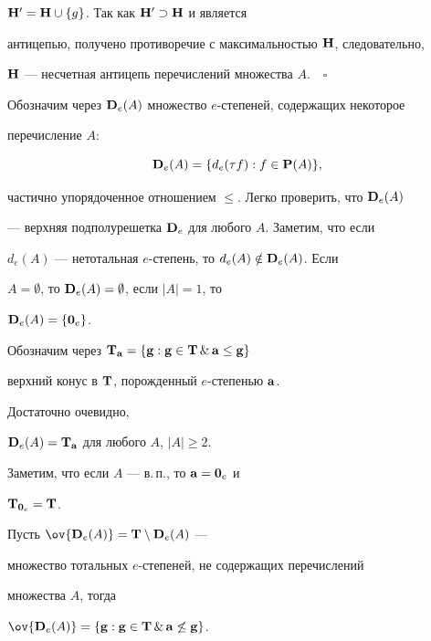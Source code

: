 ${\bold H}'={\bold H}\cup\{g\}$. Так как ${\bold H}'\supset{\bold H}$ и является


антицепью, получено противоречие с максимальностью ${\bold H}$, следовательно,


${\bold H}$ --- несчетная антицепь перечислений множества $A$.$\quad\square$


\medskip





Обозначим через ${\bold D}_e(A)$ множество $e$-степеней, содержащих некоторое


перечисление $A$:


$$


{\bold D}_e(A)=\{d_e(\tau f):f\in{\bold P}(A)\},


$$


частично упорядоченное отношением $\leq$. Легко проверить, что ${\bold D}_e(A)$


--- верхняя подполурешетка ${\bold D}_e$ для любого $A$. Заметим, что если


$d_e(A)$ --- нетотальная $e$-степень, то $d_e(A)\notin{\bold D}_e(A)$. Если


$A=\emptyset$, то ${\bold D}_e(A)=\emptyset$, если $| A|=1$, то


${\bold D}_e(A)=\{{\bold 0}_e\}$.





Обозначим через ${\bold T}_{\bold a}=\{{\bold g}:{\bold g}\in{\bold T}\,\&\,{\bold a}\leq{\bold g}\}$


верхний конус в ${\bold T}$, порожденный $e$-степенью ${\bold a}$.


Достаточно очевидно,


${\bold D}_e(A)={\bold T}_{\bold a}$ для любого $A$, $| A|\geq 2$.


Заметим, что если $A$ --- в.\,п., то ${\bold a}={\bold 0}_e$ и


${\bold T}_{{\bold 0}_e}={\bold T}$.





Пусть $\ov{{\bold D}_e(A)}={\bold T}\setminus{\bold D}_e(A)$ ---


множество тотальных $e$-степеней, не содержащих перечислений


множества $A$, тогда


$\ov{{\bold D}_e(A)}=\{{\bold g}:{\bold g}\in{\bold T}\,\&\,


{\bold a}\not\leq{\bold g}\}$.





